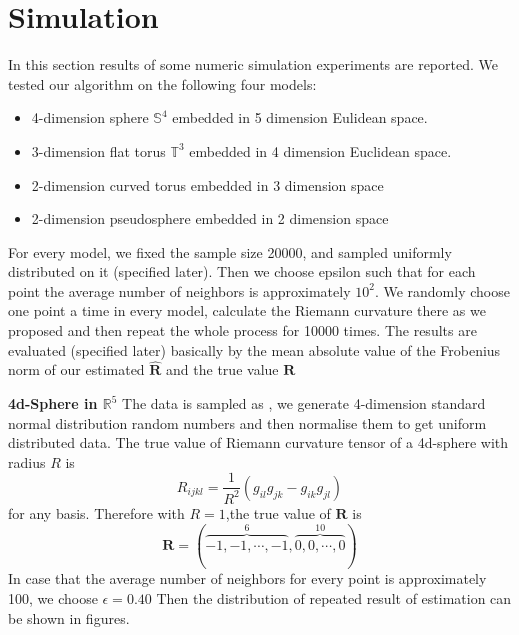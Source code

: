 \documentclass{article}
\begin{document}
\section{Simulation}
In this section results of some numeric simulation experiments are reported. We tested our algorithm on the following four models:
\begin{itemize}
	\item 4-dimension sphere $\mathbb{S}^4$ embedded in 5 dimension Eulidean space.
	\item 3-dimension flat torus $\mathbb{T}^3$ embedded in 4 dimension Euclidean space.
	\item 2-dimension curved torus embedded in 3 dimension space
	\item 2-dimension pseudosphere embedded in 2 dimension space
\end{itemize}
For every model, we fixed the sample size 20000, and sampled uniformly distributed on it (specified later). Then we choose epsilon such that for each point the average number of neighbors is approximately $10^2$. We randomly choose one point a time in every model, calculate the Riemann curvature there as we proposed and then repeat the whole process for 10000 times. The results are evaluated (specified later) basically by the mean absolute value of the Frobenius norm of our estimated $\widehat{\boldsymbol{R}}$ and the true value $\boldsymbol{R}$
\\
\par
\textbf{4d-Sphere in $\mathbb{R}^5$} The data is sampled as \cite{Uniform}, we generate 4-dimension standard normal distribution random numbers and then normalise them to get uniform distributed data. The true value of Riemann curvature tensor of a 4d-sphere with radius $R$ is
\begin{equation}
	R_{ijkl}=\frac{1}{R^2}(g_{il}g_{jk}-g_{ik}g_{jl})
\end{equation}
for any basis. Therefore with $R=1$,the true value of $\boldsymbol{R}$ is
\begin{equation}
	\boldsymbol{R}=(\overbrace{-1,-1,\cdots,-1}^{6},\overbrace{0,0,\cdots,0}^{10})
\end{equation} In case that the average number of neighbors for every point is approximately 100, we choose $\epsilon=0.40$
Then the distribution of repeated result of estimation can be shown in figures. 
\end{document}
